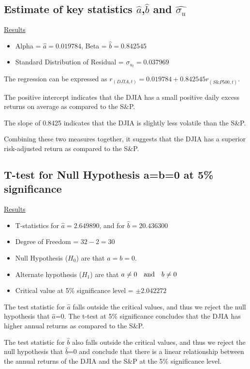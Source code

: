 \documentclass[a4paper]{article}
\begin{document}
	\subsection{Estimate of key statistics $\hat{a}$,$\hat{b}$ and $\hat{\sigma_u}$}
	\underline{Results}
	\begin{itemize}[nosep]
		\item Alpha = $\hat{a} = 0.019784$, Beta = $\hat{b} = 0.842545$
		\item Standard Distribution of Residual = $\sigma_{u_t} = 0.037969$
	\end{itemize}

    The regression can be expressed as $r_{(DJIA, t)} = 0.019784 +  0.842545 r_{(S\&P500, t)}$.
	
	The positive intercept indicates that the DJIA has a small positive daily excess returns on average as compared to the S\&P. 
	
	The slope of 0.8425 indicates that the DJIA is slightly less volatile than the S\&P. 
	
	Combining these two measures together, it suggests that the DJIA has a superior risk-adjusted return as compared to the S\&P. 
	
	
	\subsection{T-test for Null Hypothesis a=b=0 at 5\% significance}
	\underline{Results}
	\begin{itemize}[nosep]
		\item T-statistics for $\hat{a} = 2.649890$, and for $\hat{b} = 20.436300$
		\item Degree of Freedom = $32 - 2 = 30$
		\item Null Hypothesis ($H_0$) are that $a=b=0$.
		\item Alternate hypothesis ($H_1$) are that $a\ne 0 \quad \textnormal{and} \quad b\ne 0$
		\item Critical value at 5\% significance level = $\pm2.042272$
	\end{itemize}

    The test statistic for $\hat{a}$ falls outside the critical values, and thus we reject the null hypothesis that $\hat{a}$=0. The t-test at 5\% significance concludes that the DJIA has higher annual returns as compared to the S\&P.  
    
    The test statistic for $\hat{b}$ also falls outside the critical values, and thus we reject the null hypothesis that $\hat{b}$=0 and conclude that there is a linear relationship between the annual returns of the DJIA and the S\&P at the 5\% significance level.
\end{document}
